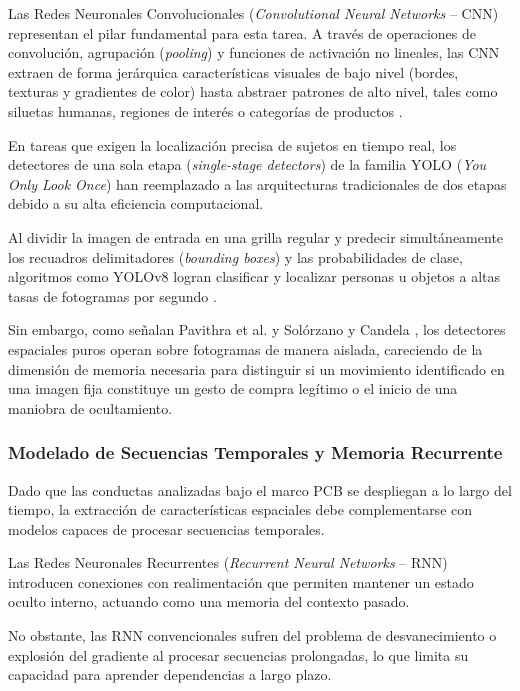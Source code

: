 Las Redes Neuronales Convolucionales (\textit{Convolutional Neural Networks} -- CNN) representan el pilar fundamental para esta tarea. A través de operaciones de convolución, agrupación (\textit{pooling}) y funciones de activación no lineales, las CNN extraen de forma jerárquica características visuales de bajo nivel (bordes, texturas y gradientes de color) hasta abstraer patrones de alto nivel, tales como siluetas humanas, regiones de interés o categorías de productos \cite{anikwe-onyiwa_recent_2025}.

En tareas que exigen la localización precisa de sujetos en tiempo real, los detectores de una sola etapa (\textit{single-stage detectors}) de la familia YOLO (\textit{You Only Look Once}) han reemplazado a las arquitecturas tradicionales de dos etapas debido a su alta eficiencia computacional.

Al dividir la imagen de entrada en una grilla regular y predecir simultáneamente los recuadros delimitadores (\textit{bounding boxes}) y las probabilidades de clase, algoritmos como YOLOv8 logran clasificar y localizar personas u objetos a altas tasas de fotogramas por segundo \cite{hameed_real_2025}.

Sin embargo, como señalan Pavithra et al. \cite{v_deep_2024} y Solórzano y Candela \cite{aguero_intelligent_2025}, los detectores espaciales puros operan sobre fotogramas de manera aislada, careciendo de la dimensión de memoria necesaria para distinguir si un movimiento identificado en una imagen fija constituye un gesto de compra legítimo o el inicio de una maniobra de ocultamiento.


\subsubsection{Modelado de Secuencias Temporales y Memoria Recurrente}

Dado que las conductas analizadas bajo el marco PCB se despliegan a lo largo del tiempo, la extracción de características espaciales debe complementarse con modelos capaces de procesar secuencias temporales.

Las Redes Neuronales Recurrentes (\textit{Recurrent Neural Networks} -- RNN) introducen conexiones con realimentación que permiten mantener un estado oculto interno, actuando como una memoria del contexto pasado.

No obstante, las RNN convencionales sufren del problema de desvanecimiento o explosión del gradiente al procesar secuencias prolongadas, lo que limita su capacidad para aprender dependencias a largo plazo.

